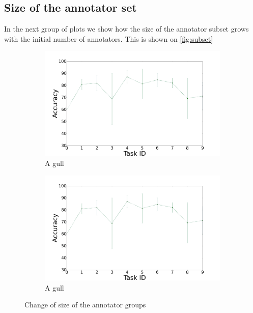 \documentclass{llncs}
\begin{document}
\subsection{Size of the annotator set}

In the next group of plots we show how the size of the annotator subset grows with the initial number of annotators. This is shown on  \autoref{fig:subset}

\begin{figure}[!htb]
    \centering
    \begin{subfigure}[b]{0.45\textwidth}
        \includegraphics[width=\textwidth]{figures/plot_mlp}
        \caption{A gull}
    \end{subfigure}
    \begin{subfigure}[b]{0.45\textwidth}
        \includegraphics[width=\textwidth]{figures/plot_mlp}
        \caption{A gull}
    \end{subfigure}
  \caption{Change of size of the annotator groups}
  \label{fig:subset}
\end{figure}
\end{document}
